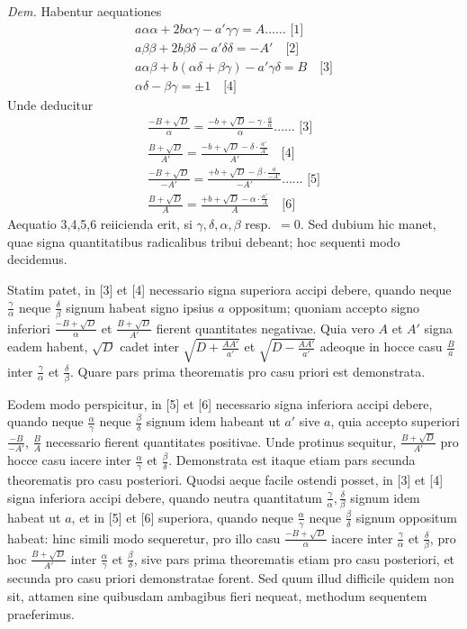 \documentclass[12pt,a4paper]{article}
\theoremstyle{plain}
\theoremstyle{definition}
\theoremstyle{remark}
\begin{document}
\textit{Dem.} Habentur aequationes
\begin{gather*}
a\alpha\alpha+2b\alpha\gamma-a'\gamma\gamma=A\ldots\ldots\text{ [1]}\\
a\beta\beta+2b\beta\delta-a'\delta\delta=-A'\quad\text{[2]}\\
a\alpha\beta+b(\alpha\delta+\beta\gamma)-a'\gamma\delta=B\quad\text{[3]}\\
\alpha\delta-\beta\gamma=\pm 1\quad\text{[4]}
\end{gather*}
Unde deducitur
\begin{gather*}
\frac{-B+\sqrt{D}}{\alpha}=\frac{-b+\sqrt{D}-\gamma\cdot\frac{a}{\alpha}}{\alpha}\ldots\ldots\text{ [3]}\\
\frac{B+\sqrt{D}}{A'}=\frac{-b+\sqrt{D}-\delta\cdot\frac{a'}{A'}}{A'}\quad\text{[4]}\\
\frac{-B+\sqrt{D}}{-A'}=\frac{+b+\sqrt{D}-\beta\cdot\frac{a}{-A'}}{-A'}\ldots\ldots\text{ [5]}\\
\frac{B+\sqrt{D}}{A}=\frac{+b+\sqrt{D}-\alpha\cdot\frac{a'}{A}}{A}\quad\text{[6]}
\end{gather*}
Aequatio 3,4,5,6 reiicienda erit, si $\gamma,\delta,\alpha,\beta$ resp.\ $=0$. Sed dubium hic manet, quae signa quantitatibus radicalibus tribui debeant; hoc sequenti modo decidemus.

Statim patet, in [3] et [4] necessario signa superiora accipi debere, quando neque $\frac{\gamma}{\alpha}$ neque $\frac{\delta}{\beta}$ signum habeat signo ipsius $a$ oppositum; quoniam accepto signo inferiori $\frac{-B+\sqrt{D}}{\alpha}$ et $\frac{B+\sqrt{D}}{A'}$ fierent quantitates negativae. Quia vero $A$ et $A'$ signa eadem habent, $\sqrt{D}$ cadet inter $\sqrt{D+\frac{AA'}{a'}}$ et $\sqrt{D-\frac{AA'}{a'}}$ adeoque in hocce casu $\frac{B}{a}$ inter $\frac{\gamma}{\alpha}$ et $\frac{\delta}{\beta}$. Quare pars prima theorematis pro casu priori est demonstrata.

Eodem modo perspicitur, in [5] et [6] necessario signa inferiora accipi debere, quando neque $\frac{\alpha}{\gamma}$ neque $\frac{\beta}{\delta}$ signum idem habeant ut $a'$ sive $a$, quia accepto superiori $\frac{-B}{-A'}$, $\frac{B}{A}$ necessario fierent quantitates positivae. Unde protinus sequitur, $\frac{B+\sqrt{D}}{A'}$ pro hocce casu iacere inter $\frac{\alpha}{\gamma}$ et $\frac{\beta}{\delta}$. Demonstrata est itaque etiam pars secunda theorematis pro casu posteriori. Quodsi aeque facile ostendi posset, in [3] et [4] signa inferiora accipi debere, quando neutra quantitatum $\frac{\gamma}{\alpha},\frac{\delta}{\beta}$ signum idem habeat ut $a$, et in [5] et [6] superiora, quando neque $\frac{\alpha}{\gamma}$ neque $\frac{\beta}{\delta}$ signum oppositum habeat: hinc simili modo sequeretur, pro illo casu $\frac{-B+\sqrt{D}}{\alpha}$ iacere inter $\frac{\gamma}{\alpha}$ et $\frac{\delta}{\beta}$, pro hoc $\frac{B+\sqrt{D}}{A'}$ inter $\frac{\alpha}{\gamma}$ et $\frac{\beta}{\delta}$, sive pars prima theorematis etiam pro casu posteriori, et secunda pro casu priori demonstratae forent. Sed quum illud difficile quidem non sit, attamen sine quibusdam ambagibus fieri nequeat, methodum sequentem praeferimus.
\end{document}
